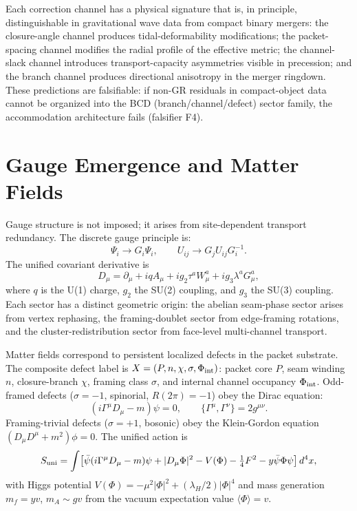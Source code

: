 \documentclass[11pt,twocolumn]{article}
\begin{document}
Each correction channel has a physical signature that is, in principle, distinguishable in gravitational wave data from compact binary mergers:\cite{ligo}
the closure-angle channel produces tidal-deformability modifications;
the packet-spacing channel modifies the radial profile of the effective metric;
the channel-slack channel introduces transport-capacity asymmetries visible in precession;
and the branch channel produces directional anisotropy in the merger ringdown.
These predictions are falsifiable: if non-GR residuals in compact-object data cannot be organized into the BCD (branch/channel/defect) sector family, the accommodation architecture fails (falsifier F4).


\section{Gauge Emergence and Matter Fields}
\label{sec:gauge}

Gauge structure is not imposed; it arises from site-dependent transport redundancy.
The discrete gauge principle is:
\begin{equation}
\label{eq:gauge-principle}
\Psi_i \to G_i\Psi_i, \qquad U_{ij} \to G_j U_{ij} G_i^{-1}.
\end{equation}
The unified covariant derivative is
\begin{equation}
\label{eq:covariant}
D_\mu = \partial_\mu + iqA_\mu + ig_2\tau^a W^a_\mu + ig_3\lambda^a G^a_\mu,
\end{equation}
where $q$ is the U(1) charge, $g_2$ the SU(2) coupling, and $g_3$ the SU(3) coupling.
Each sector has a distinct geometric origin: the abelian seam-phase sector arises from vertex rephasing, the framing-doublet sector from edge-framing rotations, and the cluster-redistribution sector from face-level multi-channel transport.

Matter fields correspond to persistent localized defects in the packet substrate.
The composite defect label is $X = (P, n, \chi, \sigma, \Phi_{\rm int})$: packet core $P$, seam winding $n$, closure-branch $\chi$, framing class $\sigma$, and internal channel occupancy $\Phi_{\rm int}$.
Odd-framed defects ($\sigma = -1$, spinorial, $R(2\pi) = -1$) obey the Dirac equation:\cite{dpd}
\begin{equation}
\label{eq:dirac}
(i\Gamma^\mu D_\mu - m)\psi = 0, \qquad \{\Gamma^\mu, \Gamma^\nu\} = 2g^{\mu\nu}.
\end{equation}
Framing-trivial defects ($\sigma = +1$, bosonic) obey the Klein-Gordon equation $(D_\mu D^\mu + m^2)\phi = 0$.
The unified action is\cite{dpd}
\begin{equation}
\label{eq:unified-action}
S_{\rm uni} = \int\!\left[\bar\psi(i\Gamma^\mu D_\mu - m)\psi + |D_\mu\Phi|^2 - V(\Phi) - \tfrac{1}{4}F^2 - y\bar\psi\Phi\psi\right]d^4x,
\end{equation}
with Higgs potential $V(\Phi) = -\mu^2|\Phi|^2 + (\lambda_H/2)|\Phi|^4$ and mass generation $m_f = yv$, $m_A \sim gv$ from the vacuum expectation value $\langle\Phi\rangle = v$.
\end{document}

